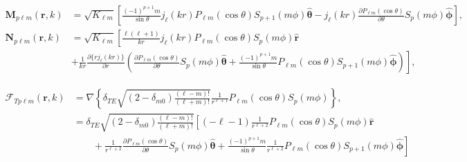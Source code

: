 \documentclass{article}
\begin{document}
\begin{equation}
\begin{split}
\mathbf{M}_{p\ell m}(\mathbf{r},k) &= \sqrt{K_{\ell m}}\left[\frac{(-1)^{p + 1}m}{\sin\theta}j_\ell(kr)P_{\ell m}(\cos\theta)S_{p+1}(m\phi)\hat{\bm{\theta}} - j_\ell(kr)\frac{\partial P_{\ell m}(\cos\theta)}{\partial\theta}S_p(m\phi)\hat{\bm{\phi}}\right],\\[0.5em]
\mathbf{N}_{p\ell m}(\mathbf{r},k) &= \sqrt{K_{\ell m}}\left[\frac{\ell(\ell + 1)}{kr}j_\ell(kr)P_{\ell m}(\cos\theta)S_p(m\phi)\hat{\mathbf{r}}\right.\\
&+ \left.\frac{1}{kr}\frac{\partial\{rj_\ell(kr)\}}{\partial r}\left(\frac{\partial P_{\ell m}(\cos\theta)}{\partial\theta}S_p(m\phi)\hat{\bm{\theta}} + \frac{(-1)^{p+1}m}{\sin\theta}P_{\ell m}(\cos\theta)S_{p + 1}(m\phi)\hat{\bm{\phi}}\right)\right],
\end{split}
\end{equation}


\begin{equation}
\begin{split}
\bm{\mathcal{F}}_{Tp\ell m}(\mathbf{r},k) &= \nabla\left\{\delta_{TE}\sqrt{(2 - \delta_{m0})\frac{(\ell - m)!}{(\ell + m)!}}\frac{1}{r^{\ell + 1}} P_{\ell m}(\cos\theta)S_p(m\phi)\right\},\\
&= \delta_{TE}\sqrt{(2 - \delta_{m0})\frac{(\ell - m)!}{(\ell + m)!}}\left[(-\ell - 1)\frac{1}{r^{\ell + 2}}P_{\ell m}(\cos\theta)S_p(m\phi)\hat{\mathbf{r}}\right.\\
&\qquad+ \left.\frac{1}{r^{\ell + 2}}\frac{\partial P_{\ell m}(\cos\theta)}{\partial \theta}S_p(m\phi)\hat{\bm{\theta}} + \frac{(-1)^{p+1}m}{\sin\theta}\frac{1}{r^{\ell + 2}}P_{\ell m}(\cos\theta)S_{p+1}(m\phi)\hat{\bm{\phi}} \right]
\end{split}
\end{equation}
 
\end{document}
